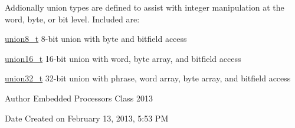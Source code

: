Addionally union types are defined to assist with integer manipulation at the word, byte, or bit level. Included are\+:
\begin{DoxyItemize}
\item \hyperlink{unionunion8__t}{union8\+\_\+t} 8-\/bit union with byte and bitfield access
\item \hyperlink{unionunion16__t}{union16\+\_\+t} 16-\/bit union with word, byte array, and bitfield access
\item \hyperlink{unionunion32__t}{union32\+\_\+t} 32-\/bit union with phrase, word array, byte array, and bitfield access
\end{DoxyItemize}

\begin{DoxyAuthor}{Author}
Embedded Processors Class 2013 
\end{DoxyAuthor}
\begin{DoxyDate}{Date}
Created on February 13, 2013, 5\+:53 P\+M 
\end{DoxyDate}
